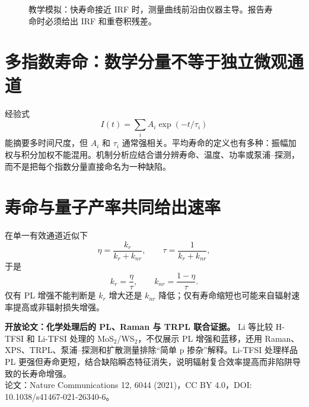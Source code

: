 \documentclass[11pt,a4paper,openany,fontset=fandol]{ctexbook}
\begin{document}
\begin{figure}[H]
\centering
{}
\caption{教学模拟：快寿命接近 IRF 时，测量曲线前沿由仪器主导。报告寿命时必须给出 IRF 和重卷积残差。}
\end{figure}

\section{多指数寿命：数学分量不等于独立微观通道}

经验式
\[
I(t)=\sum_i A_i\exp(-t/\tau_i)
\]
能摘要多时间尺度，但 $A_i$ 和 $\tau_i$ 通常强相关。平均寿命的定义也有多种：振幅加权与积分加权不能混用。机制分析应结合谱分辨寿命、温度、功率或泵浦--探测，而不是把每个指数分量直接命名为一种缺陷。

\section{寿命与量子产率共同给出速率}

在单一有效通道近似下
\[
\eta=\frac{k_r}{k_r+k_{nr}},\qquad \tau=\frac{1}{k_r+k_{nr}},
\]
于是
\[
k_r=\frac{\eta}{\tau},\qquad k_{nr}=\frac{1-\eta}{\tau}.
\]
仅有 PL 增强不能判断是 $k_r$ 增大还是 $k_{nr}$ 降低；仅有寿命缩短也可能来自辐射速率提高或非辐射损失增强。

\begin{auditbox}
\textbf{开放论文：化学处理后的 PL、Raman 与 TRPL 联合证据。} Li 等比较 H-TFSI 和 Li-TFSI 处理的 MoS$_2$/WS$_2$，不仅展示 PL 增强和蓝移，还用 Raman、XPS、TRPL、泵浦--探测和扩散测量排除“简单 p 掺杂”解释。Li-TFSI 处理样品 PL 更强但寿命更短，结合缺陷瞬态特征消失，说明辐射复合效率提高而非陷阱导致的长寿命增强。\\
论文：Nature Communications 12, 6044 (2021)，CC BY 4.0，DOI: 10.1038/s41467-021-26340-6。
\end{auditbox}
\end{document}
